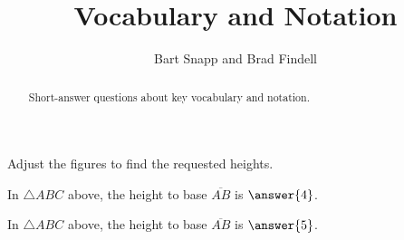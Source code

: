 \documentclass[nooutcomes]{ximera}
\title{Vocabulary and Notation}
\author{Bart Snapp and Brad Findell}
\begin{document}
\begin{abstract}
Short-answer questions about key vocabulary and notation. 
\end{abstract}
\maketitle

Adjust the figures to find the requested heights.  
\begin{center}  
\end{center}
In $\triangle ABC$ above, the height to base $\overline{AB}$ is $\answer{4}$.

\begin{center}  
\end{center}
In $\triangle ABC$ above, the height to base $\overline{AB}$ is $\answer{5}$.
\end{document}
